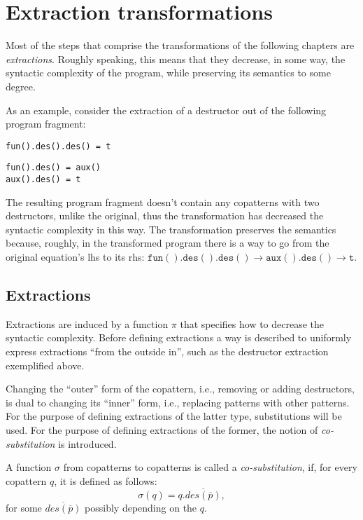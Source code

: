 \chapter{Extraction transformations}

Most of the steps that comprise the transformations of the following chapters are \textit{extractions}. Roughly speaking, this means that they decrease, in some way, the syntactic complexity of the program, while preserving its semantics to some degree.

As an example, consider the extraction of a destructor out of the following program fragment:
\begin{lstlisting}
fun().des().des() = t
\end{lstlisting}

\begin{lstlisting}
fun().des() = aux()
aux().des() = t
\end{lstlisting}
The resulting program fragment doesn't contain any copatterns with two destructors, unlike the original, thus the transformation has decreased the syntactic complexity in this way. The transformation preserves the semantics because, roughly, in the transformed program there is a way to go from the original equation's lhs to its rhs: $\mathtt{fun().des().des()} \longrightarrow \mathtt{aux().des()} \longrightarrow \mathtt{t}$.

\section{Extractions}

Extractions are induced by a function $\pi$ that specifies how to decrease the syntactic complexity. Before defining extractions a way is described to uniformly express extractions ``from the outside in'', such as the destructor extraction exemplified above.

Changing the ``outer'' form of the copattern, i.e., removing or adding destructors, is dual to changing its ``inner'' form, i.e., replacing patterns with other patterns. For the purpose of defining extractions of the latter type, substitutions will be used. For the purpose of defining extractions of the former, the notion of \textit{co-substitution} is introduced.

\begin{definition}[Co-substitution]
A function $\sigma$ from copatterns to copatterns is called a \textit{co-substitution}, if, for every copattern $q$, it is defined as follows:
\[
\sigma(q) = q.\overline{des(\overline{p})},
\]
for some $\overline{des(\overline{p})}$ possibly depending on the $q$.
\end{definition}

